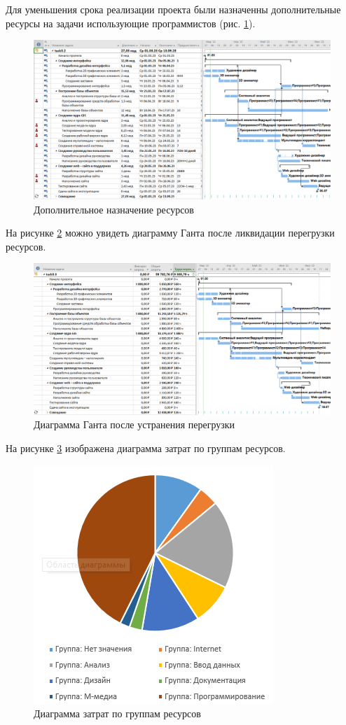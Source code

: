 Для уменьшения срока реализации проекта были назначенны дополнительные ресурсы на задачи использующие программистов (рис. \ref{p8}).

\newpage
\begin{figure}[!h]
	\centering
	\includegraphics[width=1\linewidth]{inc/img/8.png}
	\caption{Дополнительное назначение ресурсов}
	\label{p8}
\end{figure}

На рисунке \ref{p9} можно увидеть диаграмму Ганта после ликвидации перегрузки ресурсов.

\begin{figure}[!h]
	\centering
	\includegraphics[width=1\linewidth]{inc/img/9.png}
	\caption{Диаграмма Ганта после устранения перегрузки}
	\label{p9}
\end{figure}

\newpage
На рисунке \ref{d1} изображена диаграмма затрат по группам ресурсов.
\begin{figure}[!h]
	\centering
	\includegraphics[width=0.6\linewidth]{inc/img/d1.png}
	\caption{Диаграмма затрат по группам ресурсов}
	\label{d1}
\end{figure}

